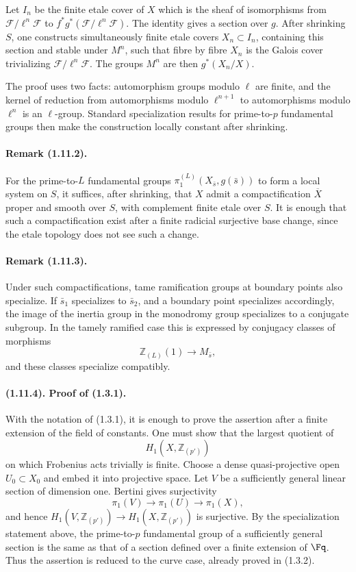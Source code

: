 Let $I_n$ be the finite etale cover of $X$ which is the sheaf of isomorphisms from $\mathcal F/\ell^n\mathcal F$ to $f^*g^*(\mathcal F/\ell^n\mathcal F)$. The identity gives a section over $g$. After shrinking $S$, one constructs simultaneously finite etale covers $X_n\subset I_n$, containing this section and stable under $M^n$, such that fibre by fibre $X_n$ is the Galois cover trivializing $\mathcal F/\ell^n\mathcal F$. The groups $M^n$ are then $g^*(X_n/X)$.

The proof uses two facts: automorphism groups modulo $\ell$ are finite, and the kernel of reduction from automorphisms modulo $\ell^{n+1}$ to automorphisms modulo $\ell^n$ is an $\ell$-group. Standard specialization results for prime-to-$p$ fundamental groups then make the construction locally constant after shrinking.

\paragraph{Remark (1.11.2).}
For the prime-to-$L$ fundamental groups $\pi_1^{(L)}(X_{\bar s},g(\bar s))$ to form a local system on $S$, it suffices, after shrinking, that $X$ admit a compactification $\overline X$ proper and smooth over $S$, with complement finite etale over $S$. It is enough that such a compactification exist after a finite radicial surjective base change, since the etale topology does not see such a change.

\paragraph{Remark (1.11.3).}
Under such compactifications, tame ramification groups at boundary points also specialize. If $\bar s_1$ specializes to $\bar s_2$, and a boundary point specializes accordingly, the image of the inertia group in the monodromy group specializes to a conjugate subgroup. In the tamely ramified case this is expressed by conjugacy classes of morphisms
\[
  \mathbb Z_{(L)}(1)\longrightarrow M_{\bar s},
\]
and these classes specialize compatibly.

\paragraph{(1.11.4). Proof of (1.3.1).}
With the notation of (1.3.1), it is enough to prove the assertion after a finite extension of the field of constants. One must show that the largest quotient of
\[
  H_1(X,\mathbb Z_{(p')})
\]
on which Frobenius acts trivially is finite. Choose a dense quasi-projective open $U_0\subset X_0$ and embed it into projective space. Let $V$ be a sufficiently general linear section of dimension one. Bertini gives surjectivity
\[
  \pi_1(V)\longrightarrow \pi_1(U)\longrightarrow \pi_1(X),
\]
and hence $H_1(V,\mathbb Z_{(p')})\to H_1(X,\mathbb Z_{(p')})$ is surjective. By the specialization statement above, the prime-to-$p$ fundamental group of a sufficiently general section is the same as that of a section defined over a finite extension of $\Fq$. Thus the assertion is reduced to the curve case, already proved in (1.3.2).

